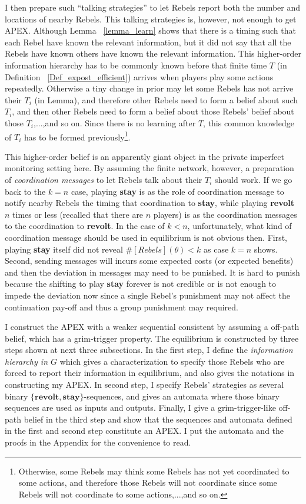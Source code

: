 \documentclass[12pt,letter]{article}
\theoremstyle{definition}
\theoremstyle{remark}
\theoremstyle{claim}
\begin{document}
I then prepare such ``talking strategies'' to let Rebels report both the number and locations of nearby Rebels. This talking strategies is, however, not enough to get APEX. Although Lemma ~\ref{lemma_learn} shows that there is a timing such that each Rebel have known the relevant information, but it did not say that all the Rebels have known others have known the relevant information. This higher-order information hierarchy has to be commonly known before that finite time $T$ (in Definition ~\ref{Def_expost_efficient}) arrives when players play some actions repeatedly. Otherwise a tiny change in prior may let some Rebels has not arrive their $T_i$ (in Lemma), and therefore other Rebels need to form a belief about such $T_i$, and then other Rebels need to form a belief about those Rebels' belief about those $T_i$,...,and so on. Since there is no learning after $T$, this common knowledge of $T_i$ has to be formed previously\footnote{Otherwise, some Rebels may think some Rebels has not yet coordinated to some actions, and therefore those Rebels will not coordinate since some Rebels will not coordinate to some actions,...,and so on.}. 

This higher-order belief is an apparently giant object in the private imperfect monitoring setting here. By assuming the finite network, however, a preparation of \textit{coordination messages} to let Rebels talk about their $T_i$ should work. If we go back to the $k=n$ case, playing \textbf{stay} is as the role of coordination message to notify nearby Rebels the timing that coordination to \textbf{stay}, while playing \textbf{revolt} $n$ times or less (recalled that there are $n$ players) is as the coordination messages to the coordination to \textbf{revolt}. In the case of $k<n$, unfortunately, what kind of coordination message should be used in equilibrium is not obvious then. First, playing \textbf{stay} itself did not reveal $\#[Rebels](\theta)<k$ as case $k=n$ shows. Second, sending messages will incurs some expected costs (or expected benefits) and then the deviation in messages may need to be punished. It is hard to punish because the shifting to play \textbf{stay} forever is not credible or is not enough to impede the deviation now since a single Rebel's punishment may not affect the continuation pay-off and thus a group punishment may required. 

I construct the APEX with a weaker sequential consistent by assuming a off-path belief, which has a grim-trigger property. The equilibrium is constructed by three steps shown at next three subsections. In the first step, I define the \textit{information hierarchy in $G$} which gives a characterization to specify those Rebels who are forced to report their information in equilibrium, and also gives the notations in constructing my APEX. In second step, I specify Rebels' strategies as several binary $\{\textbf{revolt},\textbf{stay}\}$-sequences, and gives an automata where those binary sequences are used as inputs and outputs. Finally, I give a grim-trigger-like off-path belief in the third step and show that the sequences and automata defined in the first and second step constitute an APEX. I put the automata and the proofs in the Appendix for the convenience to read.
\end{document}

